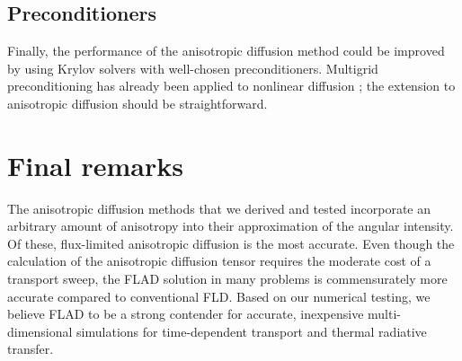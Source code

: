 \subsection{Preconditioners}

Finally, the performance of the anisotropic diffusion method could be improved
by using Krylov solvers with well-chosen preconditioners. Multigrid
preconditioning has already been applied to nonlinear diffusion \cite{Rid1999};
the extension to anisotropic diffusion should be straightforward.

\section{Final remarks}

The anisotropic diffusion methods that we derived and tested incorporate an
arbitrary amount of anisotropy into their approximation of the angular
intensity. Of these, flux-limited anisotropic diffusion is the most accurate.
Even though the calculation of the anisotropic diffusion tensor
requires the moderate cost of a transport sweep, the FLAD solution in many
problems is commensurately more accurate compared to conventional FLD. Based on
our numerical testing, we believe FLAD to be a strong contender for
accurate, inexpensive multi-dimensional simulations for time-dependent
transport and thermal radiative transfer.

